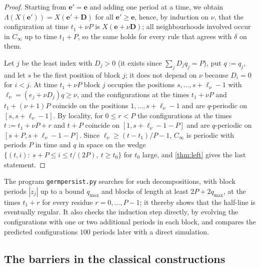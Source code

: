 \begin{proof}
Starting from $\mathbf e'=\mathbf e$ and adding one period at a time, we
obtain $\Lambda(X(\mathbf e'))=X(\mathbf e'+\mathbf D)$ for all
$\mathbf e'\ge\mathbf e$, hence, by induction on $\nu$, that the
configuration at time $t_1+\nu P$ is $X(\mathbf e+\nu\mathbf D)$; all
neighbourhoods involved occur in $C_\infty$ up to time $t_1+P$, so the same
holds for every rule that agrees with $\delta$ on them.

Let $j$ be the least index with $D_j>0$ (it exists since $\sum_jD_jq_j=P$),
put $q:=q_j$, and let $s$ be the first position of block $j$; it does not
depend on $\nu$ because $D_i=0$ for $i<j$. At time $t_1+\nu P$ block $j$
occupies the positions $s,\dots,s+\ell_\nu-1$ with
$\ell_\nu=(e_j+\nu D_j)q\ge\nu$, and the configurations at the times
$t_1+\nu P$ and $t_1+(\nu+1)P$ coincide on the positions
$1,\dots,s+\ell_\nu-1$ and are $q$-periodic on $[s,s+\ell_\nu-1]$. By
locality, for $0\le r<P$ the configurations at the times
$t:=t_1+\nu P+r$ and $t+P$ coincide on $[1,s+\ell_\nu-1-P]$ and are
$q$-periodic on $[s+P,s+\ell_\nu-1-P]$. Since $\ell_\nu\ge(t-t_1)/P-1$,
$C_\infty$ is periodic with periods $P$ in time and $q$ in space on the
wedge $\{(t,i):\ s+P\le i\le t/(2P),\ t\ge t_0\}$ for $t_0$ large, and
\cref{thm:left} gives the last statement.
\end{proof}

The program \texttt{germpersist.py} searches for such decompositions, with
block periods $|z_j|$ up to a bound $q_{\max}$ and blocks of length at
least $2P+2q_{\max}$, at the times $t_1+r$ for every residue $r=0,\dots,P-1$; it
thereby shows that the half-line is eventually regular. It also checks the
induction step directly, by evolving the configurations with one or two
additional periods in each block, and compares the predicted configurations
$100$ periods later with a direct simulation.

\subsection{The barriers in the classical constructions}\label{sec:classical}

